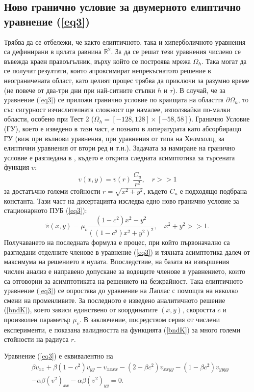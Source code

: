 \documentclass[a4paper]{article}
\newcommand{\be}{\begin{equation}}
\newcommand{\ee}{\end{equation}}
\newcommand{\rf}[1]{(\ref{#1})}
\newcommand{\RR}{\mathbb{R}}
\theoremstyle{remark}
\begin{document}
\subsection{Ново гранично условие за двумерното елиптично уравнение \rf{eq3}}\label{newBndHead}
Трябва да се отбележи, че както елиптичното, така и хиперболичното уравнения са дефинирани в цялата равнина $\RR^2$. За да се решат тези уравнения числено се въвежда краен правоъгълник, върху който се построява мрежа $\Omega_h$. Така могат да се получат резултати, които апроксимират непрекъснатото решение в неограничената област, като целият процес трябва да приключи за разумно време (не повече от два-три дни при най-ситните стъпки $h$ и $\tau$). В случай, че за уравнение \rf{eq3} се приложи гранично условие по краищата на областта $\partial \Omega_h$, то със сигурност изчислителната сложност ще намалее, използвайки по-малки области, особено при Тест 2 ($\Omega_h = [-128, 128] \times [-58, 58]$). Гранично Условие (ГУ), което е изведено в тази част, е познато в литературата като абсорбиращо ГУ (виж \cite{ref31} при вълнови уравнения, \cite{ref32} при уравнения от типа на Хелмхолц, \cite{ref33} за елиптични уравнения от втори ред и т.н.). Задачата за намиране на гранично условие е разгледана в \cite{ref116}, където е открита следната асимптотика за търсената функция $v$:
\be
v(x,y) = v(r) ~ \frac{C_u}{r^2}, \quad r>>1
\ee
за достатъчно големи стойности $r = \sqrt{x^2 + y^2}$, където $C_u$ е подходящо подбрана константа. Тази част на дисертацията изследва едно ново гранично условие за стационарното ПУБ \rf{eq3}:
\be\label{bndK}
\tilde v(x,y) = \mu_v \frac{ (1-c^2)x^2 - y^2}{ ((1-c^2)x^2 + y^2)^2}, \quad x^2 + y^2 >> 1.
\ee
Получаването на последната формула е процес, при който първоначално са разгледани отделните членове в уравнение \rf{eq3} и тяхната асимптотика далеч от максимума на решението в нулата. Впоследствие, на базата на извършения числен анализ е направено допускане за водещите членове в уравнението, които са отговорни за асимптотиката на решението на безкрайност. Така елиптичното уравнение \rf{eq3} се опростява до уравнение на Лаплас с помощта на няколко смени на променливите. За последното е изведено аналитичното решение \rf{bndK}, което зависи единствено от координатите $(x,y)$, скоростта $c$ и произволен параметър $\mu_v$. В заключение, посредством серия от числени експерименти, е показана валидността на функцията \rf{bndK} за много големи стойности на радиуса $r$. 

Уравнение \rf{eq3} е еквивалентно на 
\begin{align}\label{eq3full}
&\beta v_{xx} + \beta (1-c^2) v_{yy} - v_{xxxx} - (2-\beta c^2)v_{xxyy} - (1-\beta c^2)v_{yyyy} \nonumber \\ 
&- \alpha \beta (v^2)_{xx} - \alpha \beta (v^2)_{yy}  =0.
\end{align}
\end{document}
